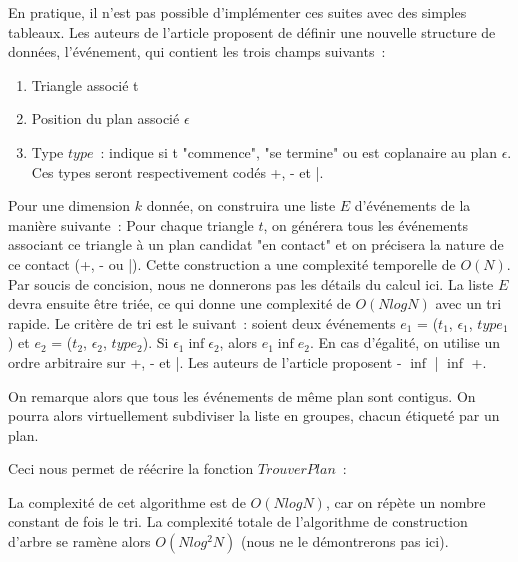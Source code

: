 \documentclass[a4paper]{article}
\begin{document}
En pratique, il n'est pas possible d'implémenter ces suites avec des simples tableaux. Les auteurs de l'article proposent de définir une nouvelle structure de données, l'événement, qui contient les trois champs suivants~:
\begin{enumerate}
	\item Triangle associé t
	\item Position du plan associé $\epsilon$
	\item Type $type$~: indique si t "commence", "se termine" ou est coplanaire au plan $\epsilon$. Ces types seront respectivement codés +, - et |.
\end{enumerate}

Pour une dimension $k$ donnée, on construira une liste $E$ d'événements de la manière suivante~: Pour chaque triangle $t$, on générera tous les événements associant ce triangle à un plan candidat "en contact" et on précisera la nature de ce contact (+, - ou |). Cette construction a une complexité temporelle de $O(N)$. Par soucis de concision, nous ne donnerons pas les détails du calcul ici. La liste $E$ devra ensuite être triée, ce qui donne une complexité de $O(NlogN)$ avec un tri rapide. Le critère de tri est le suivant~: soient deux événements $e_1$ = ($t_1$, $\epsilon_1$, $type_1$) et $e_2$ = ($t_2$, $\epsilon_2$, $type_2$). Si $\epsilon_1 \inf \epsilon_2$, alors $e_1 \inf e_2$. En cas d'égalité, on utilise un ordre arbitraire sur +, - et |. Les auteurs de l'article proposent - $\inf$ | $\inf$ +.

On remarque alors que tous les événements de même plan sont contigus. On pourra alors virtuellement subdiviser la liste en groupes, chacun étiqueté par un plan.

Ceci nous permet de réécrire la fonction $TrouverPlan$~:
\begin{algorithm}
\end{algorithm}

La complexité de cet algorithme est de $O(NlogN)$, car on répète un nombre constant de fois le tri. La complexité totale de l'algorithme de construction d'arbre se ramène alors $O(Nlog^2N)$ (nous ne le démontrerons pas ici).
\end{document}
